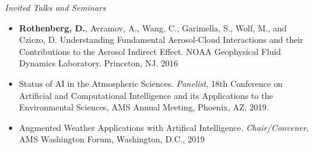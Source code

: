 \documentclass[11pt,letterpaper]{article}
\begin{document}
\emph{Invited Talks and Seminars}
\medskip
\begin{itemize}[itemindent=-10pt]

 \item \textbf{Rothenberg, D.}, Avramov, A., Wang, C., Garimella, S., Wolf, M., and Cziczo, D. Understanding Fundamental Aerosol-Cloud Interactions and their Contributions to the Aerosol Indirect Effect. NOAA Geophysical Fluid Dynamics Laboratory. Princeton, NJ. 2016
 
 \item Status of AI in the Atmospheric Sciences. \textit{Panelist}, 18th Conference on Artificial and Computational Intelligence and its Applications to the Environmental Sciences, AMS Annual Meeting, Phoenix, AZ, 2019.
 
 \item Augmented Weather Applications with Artifical Intelligence. \textit{Chair/Convener}, AMS Washington Forum, Washington, D.C., 2019

\end{itemize}
\end{document}
